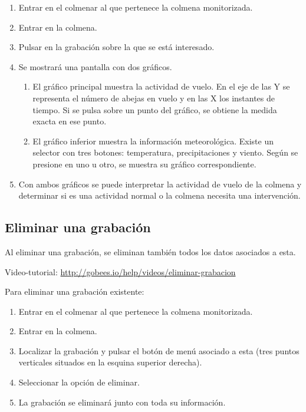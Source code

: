 \begin{enumerate}
\def\labelenumi{\arabic{enumi}.}
\tightlist
\item
  Entrar en el colmenar al que pertenece la colmena monitorizada.
\item
  Entrar en la colmena.
\item
  Pulsar en la grabación sobre la que se está interesado.
\item
  Se mostrará una pantalla con dos gráficos.

  \begin{enumerate}
  \def\labelenumii{\alph{enumii}.}
  \tightlist
  \item
    El gráfico principal muestra la actividad de vuelo. En el eje de las
    Y se representa el número de abejas en vuelo y en las X los
    instantes de tiempo. Si se pulsa sobre un punto del gráfico, se
    obtiene la medida exacta en ese punto.
  \item
    El gráfico inferior muestra la información meteorológica. Existe un
    selector con tres botones: temperatura, precipitaciones y viento.
    Según se presione en uno u otro, se muestra su gráfico
    correspondiente.
  \end{enumerate}
\item
  Con ambos gráficos se puede interpretar la actividad de vuelo de la
  colmena y determinar si es una actividad normal o la colmena necesita
  una intervención.
\end{enumerate}


\subsection{Eliminar una grabación}\label{eliminar-una-grabaciuxf3n}

Al eliminar una grabación, se eliminan también todos los datos asociados
a esta.

Video-tutorial: \url{http://gobees.io/help/videos/eliminar-grabacion}

Para eliminar una grabación existente:

\begin{enumerate}
\def\labelenumi{\arabic{enumi}.}
\tightlist
\item
  Entrar en el colmenar al que pertenece la colmena monitorizada.
\item
  Entrar en la colmena.
\item
  Localizar la grabación y pulsar el botón de menú asociado a esta (tres
  puntos verticales situados en la esquina superior derecha).
\item
  Seleccionar la opción de eliminar.
\item
  La grabación se eliminará junto con toda su información.
\end{enumerate}

